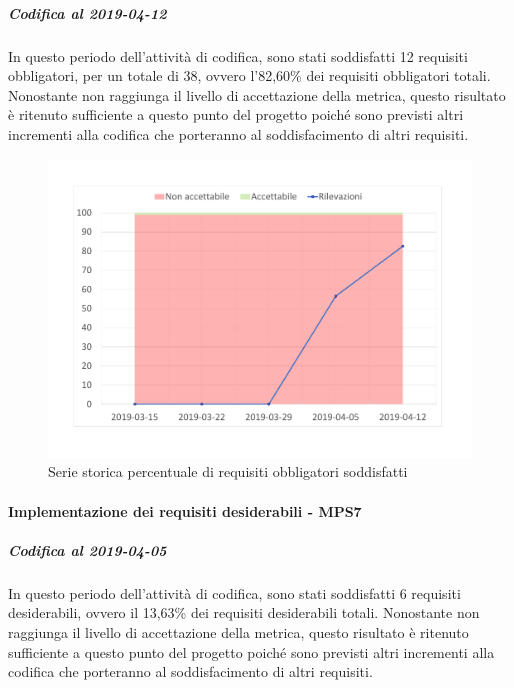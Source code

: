 \subparagraph{Codifica al 2019-04-12}
In questo periodo dell'attività di codifica, sono stati soddisfatti 12 requisiti obbligatori, per un totale di 38, ovvero l'82,60\% dei requisiti obbligatori totali.
Nonostante non raggiunga il livello di accettazione della
metrica, questo risultato è ritenuto sufficiente a questo punto del progetto poiché sono previsti altri incrementi alla codifica che porteranno al soddisfacimento di altri requisiti.
\begin{figure}[H]
	\centering
	\includegraphics[scale=0.6]{images/resoconto/MPS6Chart.pdf}
	\caption{Serie storica percentuale di requisiti obbligatori soddisfatti}	
\end{figure}

\paragraph{Implementazione dei requisiti desiderabili - MPS7}
\subparagraph{Codifica al 2019-04-05}
In questo periodo dell'attività di codifica, sono stati soddisfatti 6 requisiti desiderabili, ovvero il 13,63\% dei requisiti desiderabili totali.
Nonostante non raggiunga il livello di accettazione della
metrica, questo risultato è ritenuto sufficiente a questo punto del progetto poiché sono previsti altri incrementi alla codifica che porteranno al soddisfacimento di altri requisiti.

